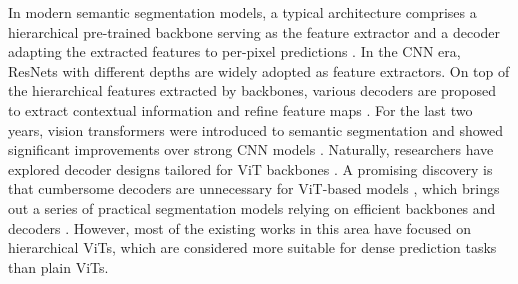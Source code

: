 \documentclass{article} \usepackage{iclr2024_conference,times}
\begin{document}
In modern semantic segmentation models, a typical architecture comprises a hierarchical pre-trained backbone serving as the feature extractor and a decoder adapting the extracted features to per-pixel predictions \citep{long2015fully,ronneberger2015u,badrinarayanan2017segnet}. In the CNN era, ResNets \citep{he2016deep} with different depths are widely adopted as feature extractors. On top of the hierarchical features extracted by backbones, various decoders are proposed to extract contextual information and refine feature maps \citep{ghiasi2016laplacian,chen2017deeplab,zhao2017pyramid,lin2017refinenet,peng2017large,zhang2018context}. For the last two years, vision transformers were introduced to semantic segmentation and showed significant improvements over strong CNN models \citep{zheng2021rethinking,liu2021swin,xie2021segformer,strudel2021segmenter,yuan2021hrformer}. Naturally, researchers have explored decoder designs tailored for ViT backbones \citep{zheng2021rethinking,xie2021segformer,cao2022swin,yan2022lawin}. A promising discovery is that cumbersome decoders are unnecessary for ViT-based models \citep{xie2021segformer}, which brings out a series of practical segmentation models relying on efficient backbones and decoders \citep{xie2021segformer,gu2022multi,guo2022segnext}. However, most of the existing works in this area have focused on hierarchical ViTs, which are considered more suitable for dense prediction tasks than plain ViTs.
\end{document}
